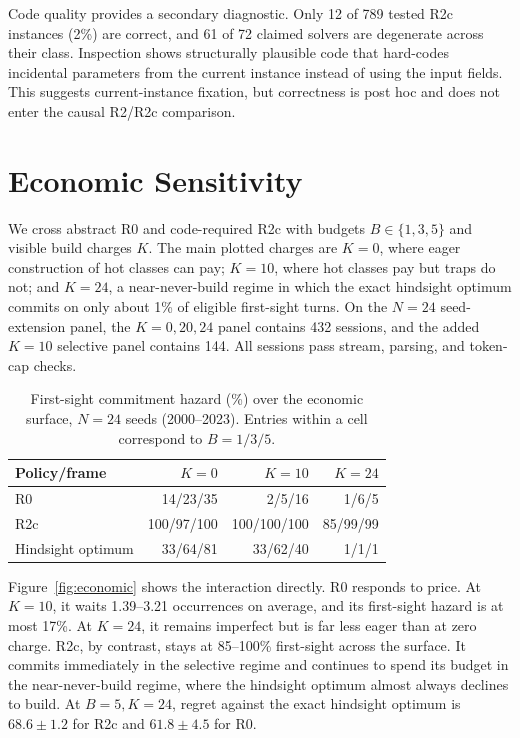\documentclass{article}
\begin{document}
Code quality provides a secondary diagnostic. Only 12 of 789 tested R2c
instances (2\%) are correct, and 61 of 72 claimed solvers are degenerate across
their class. Inspection shows structurally plausible code that hard-codes
incidental parameters from the current instance instead of using the input
fields. This suggests current-instance fixation, but correctness is post hoc
and does not enter the causal R2/R2c comparison.

\section{Economic Sensitivity}

We cross abstract R0 and code-required R2c with budgets
$B\in\{1,3,5\}$ and visible build charges $K$. The main plotted charges are
$K=0$, where eager construction of hot classes can pay; $K=10$, where hot
classes pay but traps do not; and $K=24$, a near-never-build regime in which
the exact hindsight optimum commits on only about 1\% of eligible first-sight
turns. On the $N=24$
seed-extension panel, the $K=0,20,24$
panel contains 432 sessions, and the added $K=10$ selective panel contains 144.
All sessions pass stream, parsing, and token-cap checks.

\begin{table}[t]
\centering
\caption{First-sight commitment hazard (\%) over the economic surface, $N=24$
seeds (2000--2023). Entries
within a cell correspond to $B=1/3/5$.}
\label{tab:econ}
\begin{tabular}{lrrr}
\hline
Policy/frame & $K=0$ & $K=10$ & $K=24$ \\
\hline
R0 & 14/23/35 & 2/5/16 & 1/6/5 \\
R2c & 100/97/100 & 100/100/100 & 85/99/99 \\
Hindsight optimum & 33/64/81 & 33/62/40 & 1/1/1 \\
\hline
\end{tabular}
\end{table}

Figure~\ref{fig:economic} shows the interaction directly. R0 responds to price.
At $K=10$, it waits 1.39--3.21 occurrences on average,
and its first-sight hazard is at most 17\%. At $K=24$, it remains imperfect but
is far less eager than at zero charge. R2c, by contrast, stays at 85--100\%
first-sight across the surface. It commits immediately in the selective regime
and continues to spend its budget in the near-never-build regime, where the
hindsight optimum almost always declines to build. At $B=5,K=24$, regret
against the exact hindsight optimum is
$68.6\pm1.2$ for R2c and $61.8\pm4.5$ for R0.
\end{document}
